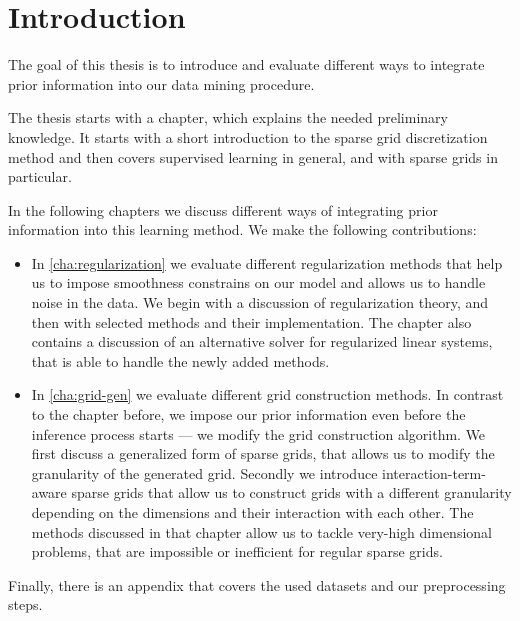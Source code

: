 \chapter{Introduction}\label{chapter:introduction}

The goal of this thesis is to introduce and evaluate different ways to integrate
prior information into our data mining procedure.

The thesis starts with a chapter, which explains the needed preliminary knowledge.
It starts with a short introduction to the sparse grid discretization method and
then covers supervised learning in general, and with sparse grids in particular.

In the following chapters we discuss different ways of integrating prior information
into this learning method.
We make the following contributions:
\begin{itemize}
\item In \cref{cha:regularization} we evaluate different regularization
  methods that help us to impose smoothness constrains on our model and allows us
  to handle noise in the data.
  We begin with a discussion of regularization theory, and then with selected
  methods and their implementation.
  The chapter also contains a discussion of an alternative solver for regularized linear
  systems, that is able to handle the newly added methods.
\item In \cref{cha:grid-gen} we evaluate different grid construction methods.
  In contrast to the chapter before, we impose our prior information even before
  the inference process starts --- we modify the grid construction algorithm.
  We first discuss a generalized form of sparse grids, that allows us to modify
  the granularity of the generated grid.
  Secondly we introduce interaction-term-aware sparse grids that allow us to construct grids with a different granularity depending on the dimensions and their interaction with each other.
  The methods discussed in that chapter allow us to tackle very-high dimensional problems, that are impossible or inefficient for regular sparse grids.
\end{itemize}

Finally, there is an appendix that covers the used datasets and our preprocessing steps.
